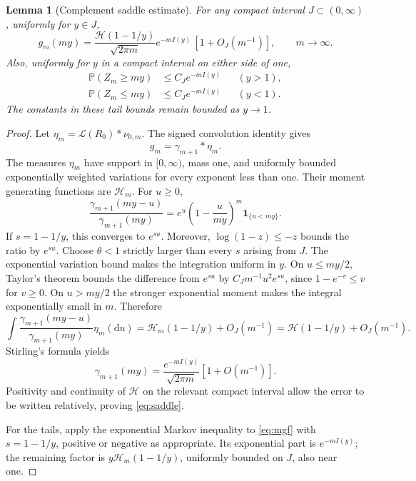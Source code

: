 \documentclass[11pt,a4paper]{article}
\numberwithin{equation}{section}
\newtheorem{lemma}[theorem]{Lemma}
\theoremstyle{definition}
\theoremstyle{remark}
\newcommand{\Pp}{\mathbb P}
\newcommand{\Law}{\mathcal L}
\newcommand{\ind}{\mathbf 1}
\newcommand{\HH}{\mathcal H}
\newcommand{\dd}{\mathrm d}
\begin{document}
\begin{lemma}[Complement saddle estimate]\label{lem:saddle}
For any compact interval $J\subset(0,\infty)$, uniformly for $y\in J$,
\begin{equation}\label{eq:saddle}
g_m(my)=\frac{\HH(1-1/y)}{\sqrt{2\pi m}}
          e^{-mI(y)}\,[1+O_J(m^{-1})],\qquad m\to\infty.
\end{equation}
Also, uniformly for $y$ in a compact interval on either side of one,
\begin{align}
\Pp(Z_m\ge my)&\le C_J e^{-mI(y)}&& (y>1),\label{eq:chernoffup}\\
\Pp(Z_m\le my)&\le C_J e^{-mI(y)}&& (y<1).
\label{eq:chernoffdown}
\end{align}
The constants in these tail bounds remain bounded as $y\to1$.
\end{lemma}
\begin{proof}
Let $\eta_m=\Law(R_0)*\nu_{0,m}$. The signed convolution identity gives
\begin{equation}\label{eq:gammacomplement}
g_m=\gamma_{m+1}*\eta_m.
\end{equation}
The measures $\eta_m$ have support in $[0,\infty)$, mass one, and
uniformly bounded exponentially weighted variations for every exponent
less than one. Their moment generating functions are $\HH_m$.
For $u\ge0$,
\begin{equation}\label{eq:gammaratio}
\frac{\gamma_{m+1}(my-u)}{\gamma_{m+1}(my)}
 =e^u\left(1-\frac{u}{my}\right)^m\ind_{\{u<my\}}.
\end{equation}
If $s=1-1/y$, this converges to $e^{su}$. Moreover,
$\log(1-z)\le-z$ bounds the ratio by $e^{su}$. Choose $\theta<1$
strictly larger than every $s$ arising from $J$. The exponential
variation bound makes the integration uniform in $y$. On $u\le my/2$,
Taylor's theorem bounds the difference from $e^{su}$ by
$C_Jm^{-1}u^2e^{su}$, since $1-e^{-v}\le v$ for $v\ge0$.
On $u>my/2$ the stronger exponential moment makes the integral
exponentially small in $m$. Therefore
\[
\int\frac{\gamma_{m+1}(my-u)}{\gamma_{m+1}(my)}\eta_m(\dd u)
 =\HH_m(1-1/y)+O_J(m^{-1})
 =\HH(1-1/y)+O_J(m^{-1}).
\]
Stirling's formula yields
\[
\gamma_{m+1}(my)=\frac{e^{-mI(y)}}{\sqrt{2\pi m}}
                  [1+O(m^{-1})].
\]
Positivity and continuity of $\HH$ on the relevant compact interval
allow the error to be written relatively, proving \eqref{eq:saddle}.

For the tails, apply the exponential Markov inequality to
\eqref{eq:mgf} with $s=1-1/y$, positive or negative as appropriate.
Its exponential part is $e^{-mI(y)}$; the remaining factor is
$y\HH_m(1-1/y)$, uniformly bounded on $J$, also near one.
\end{proof}
\end{document}
